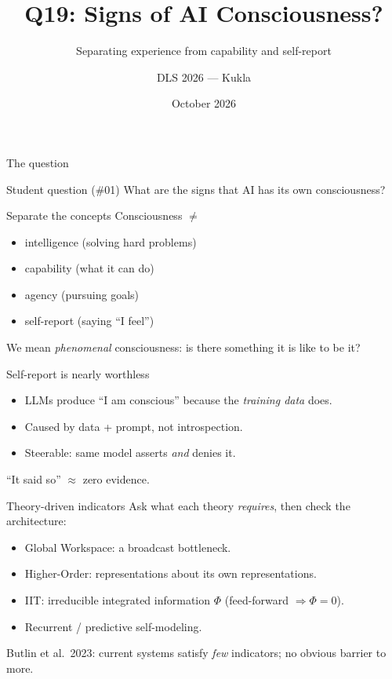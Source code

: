 \documentclass[aspectratio=169,10pt]{beamer}
\title{Q19: Signs of AI Consciousness?}
\subtitle{Separating experience from capability and self-report}
\author{DLS 2026 --- Kukla}
\date{October 2026}
\begin{document}
\maketitle

\begin{frame}{The question}
\begin{block}{Student question (\#01)}
What are the signs that AI has its own consciousness?
\end{block}
\end{frame}
\begin{frame}{Separate the concepts}
Consciousness $\ne$
\begin{itemize}
\item intelligence (solving hard problems)
\item capability (what it can do)
\item agency (pursuing goals)
\item self-report (saying ``I feel'')
\end{itemize}
\alert{We mean \emph{phenomenal} consciousness: is there something it is like to be it?}
\end{frame}
\begin{frame}{Self-report is nearly worthless}
\begin{itemize}
\item LLMs produce ``I am conscious'' because the \emph{training data} does.
\item Caused by data + prompt, not introspection.
\item Steerable: same model asserts \emph{and} denies it.
\end{itemize}
\alert{``It said so'' $\approx$ zero evidence.}
\end{frame}
\begin{frame}{Theory-driven indicators}
Ask what each theory \emph{requires}, then check the architecture:
\begin{itemize}
\item Global Workspace: a broadcast bottleneck.
\item Higher-Order: representations about its own representations.
\item IIT: irreducible integrated information $\Phi$ (feed-forward $\Rightarrow \Phi=0$).
\item Recurrent / predictive self-modeling.
\end{itemize}
\footnotesize Butlin et al.\ 2023: current systems satisfy \emph{few} indicators; no obvious barrier to more.
\end{frame}
\end{document}
